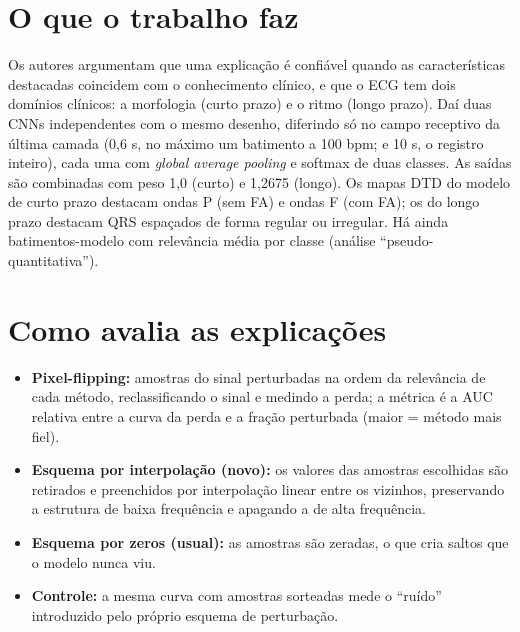 \documentclass[11pt,a4paper]{article}
\begin{document}
\section{O que o trabalho faz}
Os autores argumentam que uma explicação é confiável quando as características destacadas coincidem com o conhecimento clínico, e que o ECG tem dois domínios clínicos: a morfologia (curto prazo) e o ritmo (longo prazo). Daí duas CNNs independentes com o mesmo desenho, diferindo só no campo receptivo da última camada (0,6 s, no máximo um batimento a 100 bpm; e 10 s, o registro inteiro), cada uma com \textit{global average pooling} e softmax de duas classes. As saídas são combinadas com peso 1,0 (curto) e 1,2675 (longo). Os mapas DTD do modelo de curto prazo destacam ondas P (sem FA) e ondas F (com FA); os do longo prazo destacam QRS espaçados de forma regular ou irregular. Há ainda batimentos-modelo com relevância média por classe (análise “pseudo-quantitativa”).

\section{Como avalia as explicações}
\begin{itemize}
  \item \textbf{Pixel-flipping:} amostras do sinal perturbadas na ordem da relevância de cada método, reclassificando o sinal e medindo a perda; a métrica é a AUC relativa entre a curva da perda e a fração perturbada (maior = método mais fiel).
  \item \textbf{Esquema por interpolação (novo):} os valores das amostras escolhidas são retirados e preenchidos por interpolação linear entre os vizinhos, preservando a estrutura de baixa frequência e apagando a de alta frequência.
  \item \textbf{Esquema por zeros (usual):} as amostras são zeradas, o que cria saltos que o modelo nunca viu.
  \item \textbf{Controle:} a mesma curva com amostras sorteadas mede o “ruído” introduzido pelo próprio esquema de perturbação.
\end{itemize}
\end{document}
